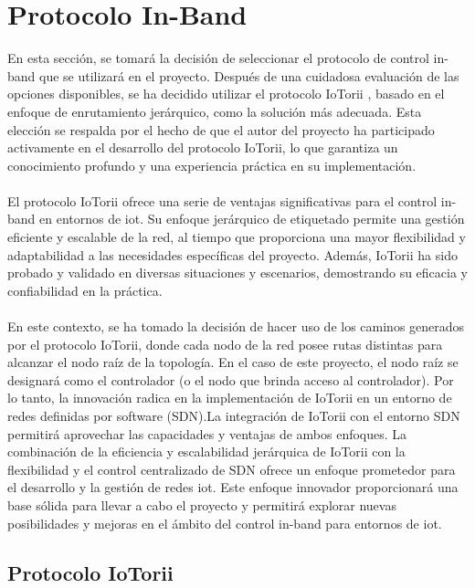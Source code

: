 \section{Protocolo In-Band}
\label{sec:ana_inband}

En esta sección, se tomará la decisión de seleccionar el protocolo de control in-band que se utilizará en el proyecto. Después de una cuidadosa evaluación de las opciones disponibles, se ha decidido utilizar el protocolo IoTorii \cite{rojas2021outperforming}, basado en el enfoque de enrutamiento jerárquico, como la solución más adecuada. Esta elección se respalda por el hecho de que el autor del proyecto ha participado activamente en el desarrollo del protocolo IoTorii, lo que garantiza un conocimiento profundo y una experiencia práctica en su implementación.\\
\\
El protocolo IoTorii ofrece una serie de ventajas significativas para el control in-band en entornos de \gls{iot}. Su enfoque jerárquico de etiquetado permite una gestión eficiente y escalable de la red, al tiempo que proporciona una mayor flexibilidad y adaptabilidad a las necesidades específicas del proyecto. Además, IoTorii ha sido probado y validado en diversas situaciones y escenarios, demostrando su eficacia y confiabilidad en la práctica.\\
\\
En este contexto, se ha tomado la decisión de hacer uso de los caminos generados por el protocolo IoTorii, donde cada nodo de la red posee rutas distintas para alcanzar el nodo raíz de la topología. En el caso de este proyecto, el nodo raíz se designará como el controlador (o el nodo que brinda acceso al controlador). Por lo tanto, la innovación radica en la implementación de IoTorii en un entorno de redes definidas por software (SDN).La integración de IoTorii con el entorno SDN permitirá aprovechar las capacidades y ventajas de ambos enfoques. La combinación de la eficiencia y escalabilidad jerárquica de IoTorii con la flexibilidad y el control centralizado de SDN ofrece un enfoque prometedor para el desarrollo y la gestión de redes \gls{iot}. Este enfoque innovador proporcionará una base sólida para llevar a cabo el proyecto y permitirá explorar nuevas posibilidades y mejoras en el ámbito del control in-band para entornos de \gls{iot}.

\subsection{Protocolo IoTorii}

